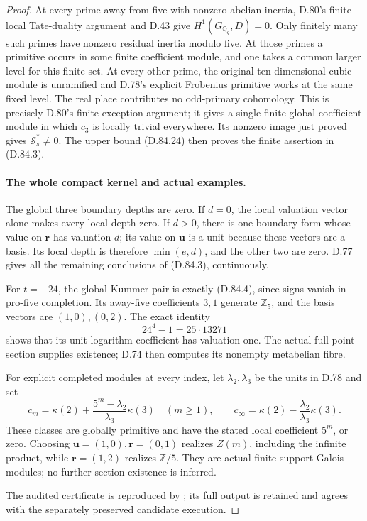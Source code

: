 \begin{proof}
At every prime away from five with nonzero abelian
inertia, D.80's finite local Tate-duality argument and
D.43 give \(H^1(G_{\mathbb Q_q},D)=0\).
Only finitely many such primes have nonzero residual
inertia modulo five. At those primes a primitive occurs
in some finite coefficient module, and one takes a
common larger level for this finite set. At every
other prime, the original ten-dimensional cubic module
is unramified and D.78's explicit Frobenius primitive
works at the same fixed level. The real place contributes
no odd-primary cohomology. This is precisely D.80's
finite-exception argument; it gives a single finite
global coefficient module in which \(c_3\) is locally
trivial everywhere. Its nonzero image just proved gives
\(\mathcal S_s^*\ne0\). The upper bound (D.84.24)
then proves the finite assertion in (D.84.3).

\paragraph{The whole compact kernel and actual examples.}
The global three boundary depths are zero. If \(d=0\),
the local valuation vector alone makes every local
depth zero. If \(d>0\), there is one boundary form
whose value on \(\mathbf r\) has valuation \(d\);
its value on \(\mathbf u\) is a unit because these
vectors are a basis. Its local depth is therefore
\(\min(e,d)\), and the other two are zero. D.77 gives
all the remaining conclusions of (D.84.3), continuously.

For \(t=-24\), the global Kummer pair is exactly
(D.84.4), since signs vanish in pro-five completion.
Its away-five coefficients \(3,1\) generate \(\mathbb Z_5\),
and the basis vectors are \((1,0),(0,2)\).
The exact identity
\[
                      24^4-1=25\cdot13271
\]
shows that its unit logarithm coefficient has valuation
one. The actual full point section supplies existence;
D.74 then computes its nonempty metabelian fibre.

For explicit completed modules at every index, let
\(\lambda_2,\lambda_3\) be the units in D.78 and set
\[
 c_m=\kappa(2)+\frac{5^m-\lambda_2}{\lambda_3}\kappa(3)
       \quad(m\ge1),\qquad
 c_\infty=\kappa(2)-\frac{\lambda_2}{\lambda_3}\kappa(3).
                                                                  \tag{D.84.25}
\]
These classes are globally primitive and have the stated
local coefficient \(5^m\), or zero.
Choosing \(\mathbf u=(1,0),\mathbf r=(0,1)\) realizes
\(Z(m)\), including the infinite product, while
\(\mathbf r=(1,2)\) realizes \(\mathbb Z/5\).
They are actual finite-support Galois modules; no further
section existence is inferred.

The audited certificate is reproduced by
; its full output is retained
and agrees with the separately preserved candidate execution.
\end{proof}
